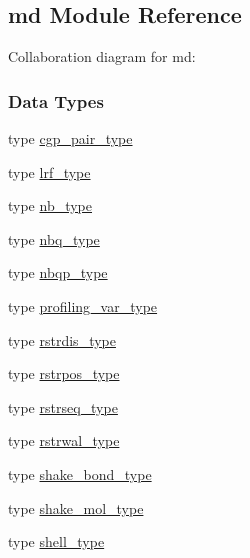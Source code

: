 \hypertarget{classmd}{\subsection{md Module Reference}
\label{classmd}
}


Collaboration diagram for md\-:
\subsubsection*{Data Types}
\begin{DoxyCompactItemize}
\item 
type \hyperlink{structmd_1_1cgp__pair__type}{cgp\-\_\-pair\-\_\-type}
\item 
type \hyperlink{structmd_1_1lrf__type}{lrf\-\_\-type}
\item 
type \hyperlink{structmd_1_1nb__type}{nb\-\_\-type}
\item 
type \hyperlink{structmd_1_1nbq__type}{nbq\-\_\-type}
\item 
type \hyperlink{structmd_1_1nbqp__type}{nbqp\-\_\-type}
\item 
type \hyperlink{structmd_1_1profiling__var__type}{profiling\-\_\-var\-\_\-type}
\item 
type \hyperlink{structmd_1_1rstrdis__type}{rstrdis\-\_\-type}
\item 
type \hyperlink{structmd_1_1rstrpos__type}{rstrpos\-\_\-type}
\item 
type \hyperlink{structmd_1_1rstrseq__type}{rstrseq\-\_\-type}
\item 
type \hyperlink{structmd_1_1rstrwal__type}{rstrwal\-\_\-type}
\item 
type \hyperlink{structmd_1_1shake__bond__type}{shake\-\_\-bond\-\_\-type}
\item 
type \hyperlink{structmd_1_1shake__mol__type}{shake\-\_\-mol\-\_\-type}
\item 
type \hyperlink{structmd_1_1shell__type}{shell\-\_\-type}
\end{DoxyCompactItemize}

